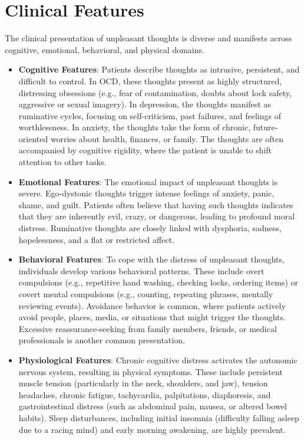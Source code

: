 \section*{Clinical Features}
The clinical presentation of unpleasant thoughts is diverse and manifests across cognitive, emotional, behavioral, and physical domains.
\begin{itemize}
  \item \textbf{Cognitive Features}: Patients describe thoughts as intrusive, persistent, and difficult to control. In OCD, these thoughts present as highly structured, distressing obsessions (e.g., fear of contamination, doubts about lock safety, aggressive or sexual imagery). In depression, the thoughts manifest as ruminative cycles, focusing on self-criticism, past failures, and feelings of worthlessness. In anxiety, the thoughts take the form of chronic, future-oriented worries about health, finances, or family. The thoughts are often accompanied by cognitive rigidity, where the patient is unable to shift attention to other tasks.
  \item \textbf{Emotional Features}: The emotional impact of unpleasant thoughts is severe. Ego-dystonic thoughts trigger intense feelings of anxiety, panic, shame, and guilt. Patients often believe that having such thoughts indicates that they are inherently evil, crazy, or dangerous, leading to profound moral distress. Ruminative thoughts are closely linked with dysphoria, sadness, hopelessness, and a flat or restricted affect.
  \item \textbf{Behavioral Features}: To cope with the distress of unpleasant thoughts, individuals develop various behavioral patterns. These include overt compulsions (e.g., repetitive hand washing, checking locks, ordering items) or covert mental compulsions (e.g., counting, repeating phrases, mentally reviewing events). Avoidance behavior is common, where patients actively avoid people, places, media, or situations that might trigger the thoughts. Excessive reassurance-seeking from family members, friends, or medical professionals is another common presentation.
  \item \textbf{Physiological Features}: Chronic cognitive distress activates the autonomic nervous system, resulting in physical symptoms. These include persistent muscle tension (particularly in the neck, shoulders, and jaw), tension headaches, chronic fatigue, tachycardia, palpitations, diaphoresis, and gastrointestinal distress (such as abdominal pain, nausea, or altered bowel habits). Sleep disturbances, including initial insomnia (difficulty falling asleep due to a racing mind) and early morning awakening, are highly prevalent.
\end{itemize}

